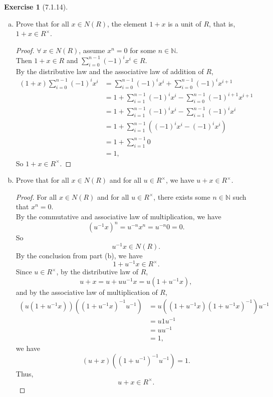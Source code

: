 \documentclass{amsart}
\newcommand{\bbn}{\mathbb{N}}
\theoremstyle{plain}
\theoremstyle{definition}
\newtheorem{exer}[lem]{Exercise}
\begin{document}
\begin{exer}[7.1.14]
\begin{enumerate}[(a)]
\begin{proof}
\end{proof}
\item Prove that for all $x\in N(R)$, the element $1+x$ is a unit of $R$, that is, $1+x\in R^\times$.
  \begin{proof}
	$\forall\ x \in N(R)$, assume $x^n = 0$ for some $n \in \bbn$.\\
  	Then $1+x \in R$ and $\sum_{i=0}^{n-1}(-1)^ix^i \in R$.\\
  	By the distributive law and the associative law of addition of $R$,
  	\begin{align*}
	  (1+x) \sum_{i=0}^{n-1}(-1)^ix^i &= \sum_{i=0}^{n-1}(-1)^ix^i + \sum_{i=0}^{n-1}(-1)^ix^{i+1}\\
	   					  			  &= 1 + \sum_{i=1}^{n-1}(-1)^ix^i -\sum_{i=0}^{n-1}(-1)^{i+1}x^{i+1} \\
	   					  			  &= 1 + \sum_{i=1}^{n-1}(-1)^ix^i -\sum_{i=1}^{n-1}(-1)^{i}x^{i} \\
	  								  &= 1+ \sum_{i=1}^{n-1}\left((-1)^ix^i-(-1)^ix^i\right)\\
	  								  &=1+\sum_{i=1}^{n-1} 0\\
	  								  &=1,
  	\end{align*}
  	So $1+x \in R^{\times}$.
  \end{proof}
\item Prove that for all $x\in N(R)$ and for all $u\in R^\times$, we have $u+x\in R^\times$.
  	\begin{proof}
  		For all $x\in N(R)$ and for all $u\in R^\times$, there exists some $n \in \bbn$ such that $x^n = 0$.\\
		By the commutative and associative law of multiplication, we have
  		\[\left(u^{-1} x \right)^n = u^{-n}x^n = u^{-n} 0  = 0.\]
		So 
		\[u^{-1}x \in N(R).\]
		By the conclusion from part (b), we have
		\[1+u^{-1}x \in R^\times.\]
		Since $u \in R^\times$, by the distributive law of $R$,
		\[u+x = u + uu^{-1}x=u\left(1+u^{-1}x\right),\]
		and by the associative law of multiplication of $R$,
		\begin{align*}
		  \left(u\left(1+u^{-1}x\right)\right) \left(\left(1+u^{-1}x\right)^{-1}u^{-1}\right) &= u \left(\left(1+u^{-1}x\right)\left(1+u^{-1}x\right)^{-1}\right)u^{-1}\\
		  &=u1u^{-1} \\
		  &=uu^{-1} \\
		  &= 1, 
	    \end{align*}
		we have
		\[(u+x) \left(\left(1+u^{-1}\right)^{-1}u^{-1}\right) = 1.\]
		Thus,
		\[u+x \in R^{\times}.\]
  	\end{proof}
\end{enumerate}

\end{exer}
\end{document}
